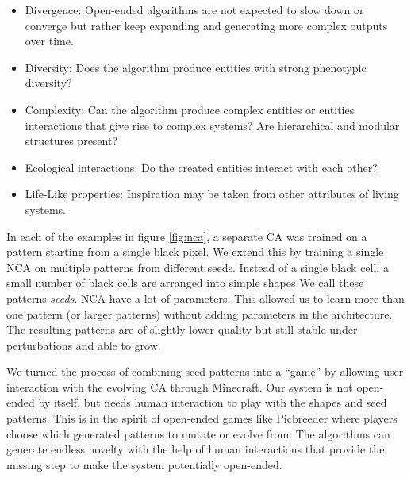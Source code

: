 \begin{itemize}
  \item Divergence: Open-ended algorithms are not expected to slow down or
        converge but rather keep expanding and generating more complex outputs
        over time.

  \item Diversity: Does the algorithm produce entities with strong phenotypic
        diversity?

  \item Complexity: Can the algorithm produce complex entities or entities
        interactions that give rise to complex systems? Are hierarchical and
        modular structures present?

  \item Ecological interactions: Do the created entities interact with each
        other?

  \item Life-Like properties: Inspiration may be taken from other attributes of
        living systems.
\end{itemize}

In each of the examples in figure \ref{fig:nca}, a separate \ac{CA} was trained
on a pattern starting from a single black pixel. We extend this by training a
single \ac{NCA} on multiple patterns from different seeds. Instead of a single
black cell, a small number of black cells are arranged into simple shapes We
call these patterns \emph{seeds}. \ac{NCA} have a lot of parameters. This
allowed us to learn more than one pattern (or larger patterns) without adding
parameters in the architecture. The resulting patterns are of slightly lower
quality but still stable under perturbations and able to grow.

We turned the process of combining seed patterns into a “game” by allowing user
interaction with the evolving CA through Minecraft. Our system is not open-ended
by itself, but needs human interaction to play with the shapes and seed
patterns. This is in the spirit of open-ended games like Picbreeder
\parencite{secretanPicbreederCaseStudy2011, woolleyDeleteriousEffectsPriori2011}
where players choose which generated patterns to mutate or evolve from. The
algorithms can generate endless novelty with the help of human interactions that
provide the missing step to make the system potentially open-ended.

